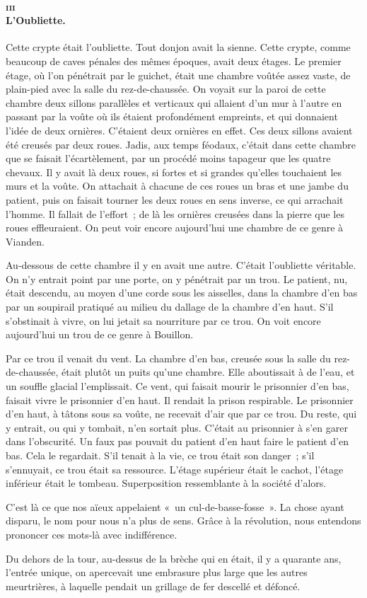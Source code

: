 \documentclass[french,twoside]{book} %
\begin{document}
\paragraph[{iii L’Oubliette.}]{\textsc{iii} \\
L’Oubliette.}
\label{p3l2c9p3}
\noindent Cette crypte était l’oubliette. Tout donjon avait la sienne. Cette crypte, comme beaucoup de caves pénales des mêmes époques, avait deux étages. Le premier étage, où l’on pénétrait par le guichet, était une chambre voûtée assez vaste, de plain-pied avec la salle du rez-de-chaussée. On voyait sur la paroi de cette chambre deux sillons parallèles et verticaux qui allaient d’un mur à l’autre en passant par la voûte où ils étaient profondément empreints, et qui donnaient l’idée de deux ornières. C’étaient deux ornières en effet. Ces deux sillons avaient été creusés par deux roues. Jadis, aux temps féodaux, c’était dans cette chambre que se faisait l’écartèlement, par un procédé moins tapageur que les quatre chevaux. Il y avait là deux roues, si fortes et si grandes qu’elles touchaient  les murs et la voûte. On attachait à chacune de ces roues un bras et une jambe du patient, puis on faisait tourner les deux roues en sens inverse, ce qui arrachait l’homme. Il fallait de l’effort ; de là les ornières creusées dans la pierre que les roues effleuraient. On peut voir encore aujourd’hui une chambre de ce genre à Vianden.\par
Au-dessous de cette chambre il y en avait une autre. C’était l’oubliette véritable. On n’y entrait point par une porte, on y pénétrait par un trou. Le patient, nu, était descendu, au moyen d’une corde sous les aisselles, dans la chambre d’en bas par un soupirail pratiqué au milieu du dallage de la chambre d’en haut. S’il s’obstinait à vivre, on lui jetait sa nourriture par ce trou. On voit encore aujourd’hui un trou de ce genre à Bouillon.\par
Par ce trou il venait du vent. La chambre d’en bas, creusée sous la salle du rez-de-chaussée, était plutôt un puits qu’une chambre. Elle aboutissait à de l’eau, et un souffle glacial l’emplissait. Ce vent, qui faisait mourir le prisonnier d’en bas, faisait vivre le prisonnier d’en haut. Il rendait la prison respirable. Le prisonnier d’en haut, à tâtons sous sa voûte, ne recevait d’air que par ce trou. Du reste, qui y entrait, ou qui y tombait, n’en sortait plus. C’était au prisonnier à s’en garer dans l’obscurité. Un faux pas pouvait du patient d’en haut faire le patient d’en bas. Cela le regardait. S’il tenait à la vie, ce trou était son danger ; s’il s’ennuyait, ce trou était sa ressource. L’étage supérieur était le cachot, l’étage inférieur était le tombeau.  Superposition ressemblante à la société d’alors.\par
C’est là ce que nos aïeux appelaient « un cul-de-basse-fosse ». La chose ayant disparu, le nom pour nous n’a plus de sens. Grâce à la révolution, nous entendons prononcer ces mots-là avec indifférence.\par
Du dehors de la tour, au-dessus de la brèche qui en était, il y a quarante ans, l’entrée unique, on apercevait une embrasure plus large que les autres meurtrières, à laquelle pendait un grillage de fer descellé et défoncé.
\end{document}
